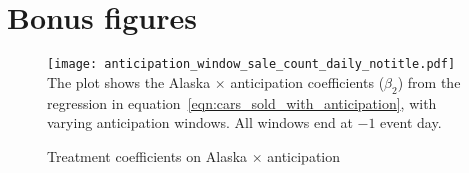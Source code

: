 \documentclass[11pt,letterpaper,oneside]{article}
\begin{document}
\pagebreak
\printbibliography



\appendix

\section{Bonus figures}

\begin{figure}[hbt]
    \caption{Treatment coefficients on Alaska $\times$ anticipation}
    \label{fig:anticipation_window_sale_count_daily}
    \texttt{[image: anticipation\_window\_sale\_count\_daily\_notitle.pdf]}
    {\footnotesize
    The plot shows the Alaska $\times$ anticipation coefficients ($\beta_2$) from the regression in equation~\ref{eqn:cars_sold_with_anticipation}, with varying anticipation windows.
    All windows end at $-1$ event day.
    }
\end{figure}
\end{document}

